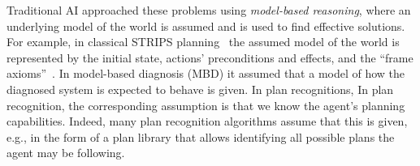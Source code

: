 \documentclass[12pt]{article}
\begin{document}
Traditional AI approached these problems using {\em model-based reasoning}, where an underlying model of the world is assumed and is used to find effective solutions. For example, in classical STRIPS planning~\cite{fikes1971strips} the assumed model of the world is  represented by the initial state, actions' preconditions and effects, and the ``frame axioms''~\cite{ghallab2004automated}. 
In model-based diagnosis (MBD) it assumed that a model of how the diagnosed system is expected to behave is given. In plan recognitions, In plan recognition, the corresponding assumption is that we know the agent's planning capabilities. Indeed, many plan recognition algorithms assume that this is given, e.g., in the form of a plan library that allows identifying all possible plans the agent may be following. %



\end{document}
